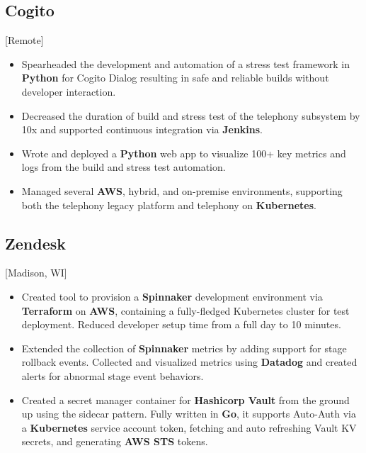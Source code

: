 \documentclass{mycv}
\begin{document}
\subsection{Cogito}[Remote]
\begin{positions}
\end{positions}
\begin{itemize}
  \item {
  Spearheaded the development and automation of a stress test framework in \textbf{Python} for Cogito Dialog
  resulting in safe and reliable builds without developer interaction. 
  }
  \item{
  Decreased the duration of build and stress test of the telephony subsystem by 10x and supported continuous integration via \textbf{Jenkins}.
  }
    \item {
  Wrote and deployed a \textbf{Python} web app to visualize 100+ key metrics and logs from the build and stress test automation.   
}
  \item{
  Managed several \textbf{AWS}, hybrid, and on-premise environments, supporting both the telephony legacy platform and telephony on \textbf{Kubernetes}.
  }
\end{itemize}

\subsection{Zendesk}[Madison, WI]
\begin{positions}
\end{positions}
\begin{itemize}
\iffalse
  \item {
     Collaborated closely with local and global team members to build large scale, efficient, and safe \textbf{CI/CD} pipelines that deploy to over dozens of servers globally for 300 million end users.
  }
\fi
  \item {
  Created tool to provision a \textbf{Spinnaker} development environment via \textbf{Terraform} on \textbf{AWS}, containing a fully-fledged Kubernetes cluster for test deployment. Reduced developer setup time from a full day to 10 minutes. 
  }
  \item {
  Extended the collection of \textbf{Spinnaker} metrics by adding support for stage rollback events. Collected and visualized metrics using \textbf{Datadog} and created alerts for abnormal stage event behaviors. 
  }
  \item {
  Created a secret manager container for \textbf{Hashicorp Vault} from the ground up using the sidecar pattern. Fully written in \textbf{Go}, it supports Auto-Auth via a \textbf{Kubernetes} service account token, fetching and auto refreshing Vault KV secrets, and generating \textbf{AWS STS} tokens.
  }
 \end{itemize}
\end{document}

